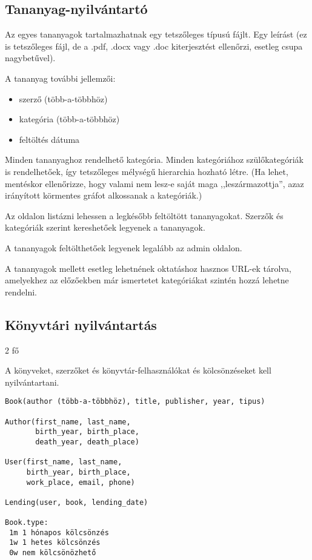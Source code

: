 \documentclass[a4paper]{article}
\begin{document}
\subsection{Tananyag-nyilvántartó}

Az egyes tananyagok tartalmazhatnak egy tetszőleges típusú fájlt. Egy
leírást (ez is tetszőleges fájl, de a .pdf, .docx vagy .doc
kiterjesztést ellenőrzi, esetleg csupa nagybetűvel).

A tananyag további jellemzői:
\begin{itemize}
    \item szerző (több-a-többhöz)
    \item kategória (több-a-többhöz)
    \item feltöltés dátuma
\end{itemize}

Minden tananyaghoz rendelhető kategória. Minden kategóriához
szülőkategóriák is rendelhetőek, így tetszőleges mélységű hierarchia
hozható létre. (Ha lehet, mentéskor ellenőrizze, hogy valami nem lesz-e
saját maga ,,leszármazottja'', azaz irányított körmentes gráfot
alkossanak a kategóriák.)

Az oldalon listázni lehessen a legkésőbb feltöltött tananyagokat.
Szerzők és kategóriák szerint kereshetőek legyenek a tananyagok.

A tananyagok feltölthetőek legyenek legalább az admin oldalon.

A tananyagok mellett esetleg lehetnének oktatáshoz hasznos URL-ek
tárolva, amelyekhez az előzőekben már ismertetet kategóriákat szintén
hozzá lehetne rendelni.

\subsection{Könyvtári nyilvántartás}

2 fő

A könyveket, szerzőket és könyvtár-felhasználókat és kölcsönzéseket kell
nyilvántartani.


\begin{verbatim}
Book(author (több-a-többhöz), title, publisher, year, tipus)

Author(first_name, last_name,
       birth_year, birth_place,
       death_year, death_place)

User(first_name, last_name,
     birth_year, birth_place,
     work_place, email, phone)

Lending(user, book, lending_date)

Book.type:
 1m 1 hónapos kölcsönzés
 1w 1 hetes kölcsönzés
 0w nem kölcsönözhető
\end{verbatim}
\end{document}
